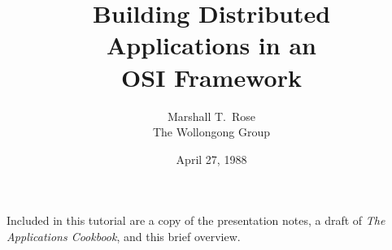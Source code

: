 





\title{Building Distributed\\ Applications in an\\ OSI Framework}
\author{Marshall T.~Rose\\ The Wollongong Group}
\date{April 27, 1988}
\maketitle

Included in this tutorial are a copy of the presentation notes,
a draft of {\em The Applications Cookbook},
and this brief overview.

